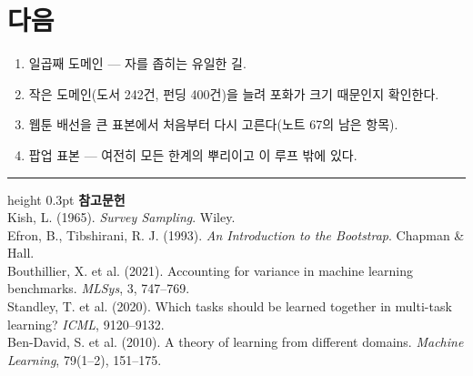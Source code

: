 \documentclass[10pt]{article}
\begin{document}
\section{다음}

\begin{enumerate}[leftmargin=1.3em,itemsep=0.15em]
\item 일곱째 도메인 --- 자를 좁히는 유일한 길.
\item 작은 도메인(도서 242건, 펀딩 400건)을 늘려 포화가 크기 때문인지 확인한다.
\item 웹툰 배선을 큰 표본에서 처음부터 다시 고른다(노트 67의 남은 항목).
\item 팝업 표본 --- 여전히 모든 한계의 뿌리이고 이 루프 밖에 있다.
\end{enumerate}

\vspace{0.6em}
\hrule height 0.3pt
\vspace{0.5em}
{\footnotesize
\textbf{참고문헌}\\[0.3em]
Kish, L. (1965). \emph{Survey Sampling}. Wiley.\\[0.15em]
Efron, B., Tibshirani, R. J. (1993). \emph{An Introduction to the Bootstrap}.
Chapman \& Hall.\\[0.15em]
Bouthillier, X. et al. (2021). Accounting for variance in machine learning
benchmarks. \emph{MLSys}, 3, 747--769.\\[0.15em]
Standley, T. et al. (2020). Which tasks should be learned together in multi-task
learning? \emph{ICML}, 9120--9132.\\[0.15em]
Ben-David, S. et al. (2010). A theory of learning from different domains.
\emph{Machine Learning}, 79(1--2), 151--175.
}
\end{document}
